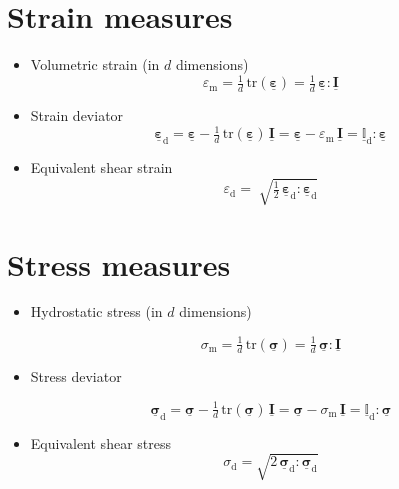 \documentclass[times,namecite]{goose-article}
\newcommand\T[1]{\underline{\bm{{#1}}}}
\newcommand\TT[1]{\underline{\mathbb{{#1}}}}
\begin{document}
\section{Strain measures}
\label{sec:nomenclature::strain}

\begin{itemize}

    \item Volumetric strain (in $d$ dimensions)
    \begin{equation}
        \varepsilon_\mathrm{m}
        = \tfrac{1}{d} \, \mathrm{tr} ( \T{\varepsilon} )
        = \tfrac{1}{d} \, \T{\varepsilon} : \T{I}
    \end{equation}

    \item Strain deviator
    \begin{equation}
        \T{\varepsilon}_\mathrm{d}
        = \T{\varepsilon} - \tfrac{1}{d} \, \mathrm{tr} ( \T{\varepsilon} ) \, \T{I}
        = \T{\varepsilon} - \varepsilon_\mathrm{m} \, \T{I}
        = \TT{I}_\mathrm{d} : \T{\varepsilon}
    \end{equation}

    \item Equivalent shear strain
    \begin{equation}
        \varepsilon_\mathrm{d}
        = \; \sqrt{
          \tfrac{1}{2} \, \T{\varepsilon}_\mathrm{d} : \T{\varepsilon}_\mathrm{d}
        }
    \end{equation}

\end{itemize}

\section{Stress measures}
\label{sec:nomenclature::stress}

\begin{itemize}

    \item Hydrostatic stress (in $d$ dimensions)

    \begin{equation}
        \sigma_\mathrm{m}
        = \tfrac{1}{d} \, \mathrm{tr} ( \T{\sigma} )
        = \tfrac{1}{d} \, \T{\sigma} : \T{I}
    \end{equation}

    \item Stress deviator

    \begin{equation}
        \T{\sigma}_\mathrm{d}
        = \T{\sigma} - \tfrac{1}{d} \, \mathrm{tr} ( \T{\sigma} ) \, \T{I}
        = \T{\sigma} - \sigma_\mathrm{m} \, \T{I}
        = \TT{I}_\mathrm{d} : \T{\sigma}
    \end{equation}

    \item Equivalent shear stress
    \begin{equation}
        \sigma_\mathrm{d} = \sqrt{ 2 \, \T{\sigma}_\mathrm{d} : \T{\sigma}_\mathrm{d} }
    \end{equation}

\end{itemize}
\end{document}
